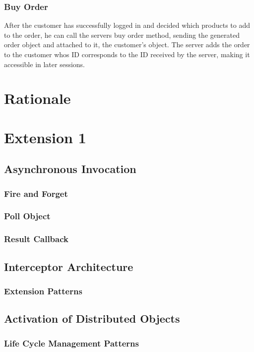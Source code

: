 \documentclass[a4paper]{article}
\begin{document}
\subsubsection{Buy Order}
After the customer has successfully logged in and decided which products to add to the order, he can call the servers buy order method, sending the generated order object and attached to it, the customer's object. The server adds the order to the customer whos ID corresponds to the ID received by the server, making it accessible in later sessions.

\section{Rationale}

\section{Extension 1}

\subsection{Asynchronous Invocation}
\subsubsection{Fire and Forget}
\subsubsection{Poll Object}
\subsubsection{Result Callback}

\subsection{Interceptor Architecture}
\subsubsection{Extension Patterns}

\subsection{Activation of Distributed Objects}
\subsubsection{Life Cycle Management Patterns}
\end{document}
